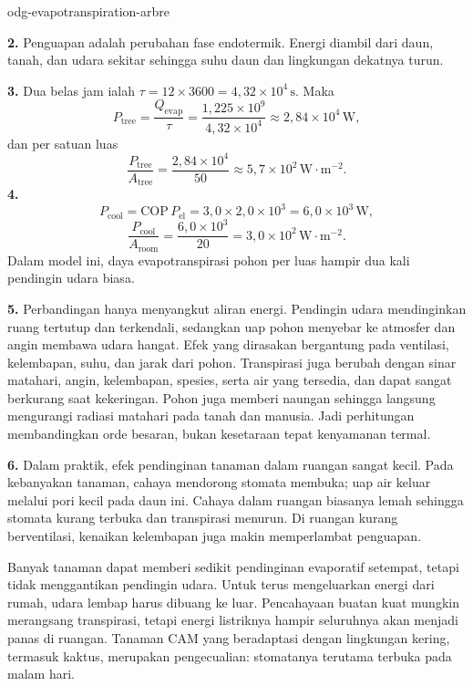 \begin{exo}{odg-evapotranspiration-arbre}
\begin{solution}
\textbf{2.} Penguapan adalah perubahan fase endotermik. Energi diambil dari daun, tanah, dan udara sekitar sehingga suhu daun dan lingkungan dekatnya turun.

\textbf{3.} Dua belas jam ialah $\tau=12\times3600=4{,}32\times10^4\,\text{s}$. Maka
\[
P_{\text{tree}}=\frac{Q_{\mathrm{evap}}}{\tau}
=\frac{1{,}225\times10^9}{4{,}32\times10^4}\approx2{,}84\times10^4\,\text{W},
\]
dan per satuan luas
\[
\frac{P_{\text{tree}}}{A_{\text{tree}}}
=\frac{2{,}84\times10^4}{50}\approx5{,}7\times10^2\,\text{W}\!\cdot\!\text{m}^{-2}.
\]
\textbf{4.}
\[
P_{\text{cool}}=\mathrm{COP}\,P_{\mathrm{el}}
=3{,}0\times2{,}0\times10^3=6{,}0\times10^3\,\text{W},
\]
\[
\frac{P_{\text{cool}}}{A_{\text{room}}}
=\frac{6{,}0\times10^3}{20}=3{,}0\times10^2\,\text{W}\!\cdot\!\text{m}^{-2}.
\]
Dalam model ini, daya evapotranspirasi pohon per luas hampir dua kali pendingin udara biasa.

\textbf{5.} Perbandingan hanya menyangkut aliran energi. Pendingin udara mendinginkan ruang tertutup dan terkendali, sedangkan uap pohon menyebar ke atmosfer dan angin membawa udara hangat. Efek yang dirasakan bergantung pada ventilasi, kelembapan, suhu, dan jarak dari pohon. Transpirasi juga berubah dengan sinar matahari, angin, kelembapan, spesies, serta air yang tersedia, dan dapat sangat berkurang saat kekeringan. Pohon juga memberi naungan sehingga langsung mengurangi radiasi matahari pada tanah dan manusia. Jadi perhitungan membandingkan orde besaran, bukan kesetaraan tepat kenyamanan termal.

\textbf{6.} Dalam praktik, efek pendinginan tanaman dalam ruangan sangat kecil. Pada kebanyakan tanaman, cahaya mendorong stomata membuka; uap air keluar melalui pori kecil pada daun ini. Cahaya dalam ruangan biasanya lemah sehingga stomata kurang terbuka dan transpirasi menurun. Di ruangan kurang berventilasi, kenaikan kelembapan juga makin memperlambat penguapan.

Banyak tanaman dapat memberi sedikit pendinginan evaporatif setempat, tetapi tidak menggantikan pendingin udara. Untuk terus mengeluarkan energi dari rumah, udara lembap harus dibuang ke luar. Pencahayaan buatan kuat mungkin merangsang transpirasi, tetapi energi listriknya hampir seluruhnya akan menjadi panas di ruangan. Tanaman CAM yang beradaptasi dengan lingkungan kering, termasuk kaktus, merupakan pengecualian: stomatanya terutama terbuka pada malam hari.
\end{solution}
\end{exo}

